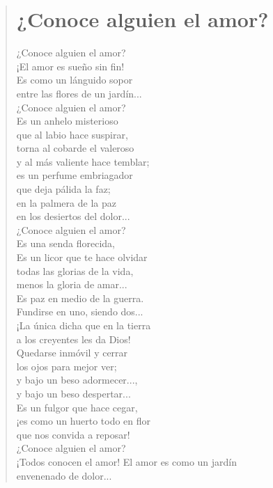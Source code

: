 \documentclass[12pt, twoside]{book}
\begin{document}
\begin{verse}
\begin{center}
\section{¿Conoce alguien el amor?}
\end{center}
¿Conoce alguien el amor?\\
¡El amor es sueño sin fin!\\
Es como un lánguido sopor\\
entre las flores de un jardín...\\
¿Conoce alguien el amor?\\
Es un anhelo misterioso\\
que al labio hace suspirar,\\
torna al cobarde el valeroso\\
y al más valiente hace temblar;\\
es un perfume embriagador\\
que deja pálida la faz;\\
en la palmera de la paz\\
en los desiertos del dolor...\\
¿Conoce alguien el amor?\\
Es una senda florecida,\\
Es un licor que te hace olvidar\\
todas las glorias de la vida,\\
menos la gloria de amar...\\
Es paz en medio de la guerra.\\
Fundirse en uno, siendo dos...\\
¡La única dicha que en la tierra\\
a los creyentes les da Dios!\\
Quedarse inmóvil y cerrar\\
los ojos para mejor ver;\\
y bajo un beso adormecer...,\\
y bajo un beso despertar...\\
Es un fulgor que hace cegar,\\
¡es como un huerto todo en flor\\
que nos convida a reposar!\\
¿Conoce alguien el amor?\\
¡Todos conocen el amor!\newpage
El amor es como un jardín\\
envenenado de dolor...\\

\end{verse}
\end{document}

